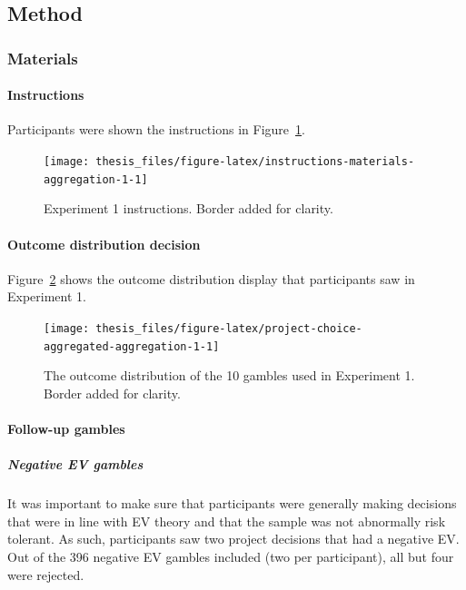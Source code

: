 \documentclass[a4paper, nobind, dvipsnames]{templates/ociamthesis}
\theoremstyle{definition}
\theoremstyle{definition}
\theoremstyle{definition}
\theoremstyle{definition}
\theoremstyle{remark}
\begin{document}
\subsection{Method}

\subsubsection{Materials}

\paragraph{Instructions}

Participants were shown the instructions in
Figure~\ref{fig:instructions-materials-aggregation-1}.



\begin{figure}
\texttt{[image: thesis\_files/figure-latex/instructions-materials-aggregation-1-1]} \caption{Experiment 1 instructions. Border added for clarity.}\label{fig:instructions-materials-aggregation-1}
\end{figure}

\paragraph{Outcome distribution decision}

Figure~\ref{fig:project-choice-aggregated-aggregation-1} shows the outcome
distribution display that participants saw in Experiment 1.



\begin{figure}
\texttt{[image: thesis\_files/figure-latex/project-choice-aggregated-aggregation-1-1]} \caption{The outcome distribution of the 10 gambles used in Experiment 1. Border added for clarity.}\label{fig:project-choice-aggregated-aggregation-1}
\end{figure}

\hypertarget{follow-up-materials-aggregation-1-appendix}{%
\paragraph{Follow-up gambles}\label{follow-up-materials-aggregation-1-appendix}}

\subparagraph{Negative EV gambles}

It was important to make sure that participants were generally making decisions
that were in line with EV theory and that the sample was not abnormally risk
tolerant. As such, participants saw two project decisions that had a negative
EV. Out of the 396 negative EV gambles
included (two per participant), all but four
were rejected.
\end{document}
